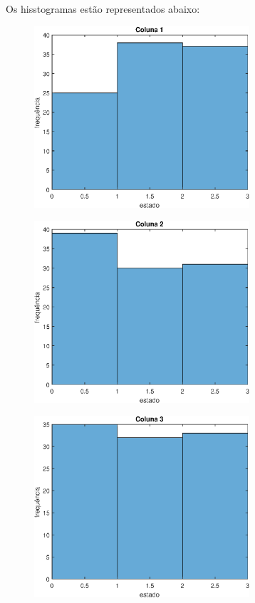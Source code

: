 \documentclass[12pt]{article}
\newenvironment{exercise}[2][Exercício]{\begin{trivlist}
\item[\hskip \labelsep {\bfseries #1}\hskip \labelsep {\bfseries #2.}]}{\end{trivlist}}
\begin{document}
\begin{exercise}{1.d} Os hisstogramas estão representados abaixo:
\begin{figure}[H]
  \centering
  \includegraphics[width=8cm]{figs/ex1_1.eps} 
\end{figure}
\begin{figure}[H]
  \centering
  \includegraphics[width=8cm]{figs/ex1_2.eps} 
\end{figure}
\begin{figure}[H]
  \centering
  \includegraphics[width=8cm]{figs/ex1_3.eps} 
\end{figure}
\begin{figure}[H]

\end{figure}
\end{exercise}
\end{document}
